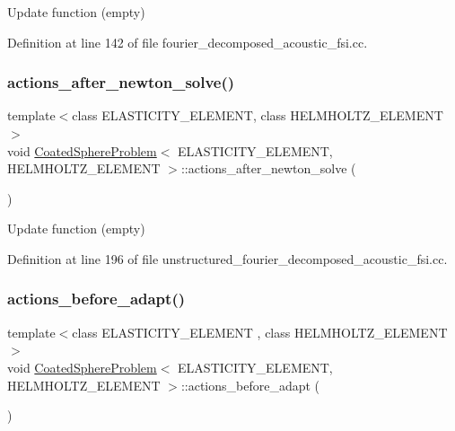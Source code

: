 Update function (empty) 



Definition at line 142 of file fourier\+\_\+decomposed\+\_\+acoustic\+\_\+fsi.\+cc.

\mbox{\label{classCoatedSphereProblem_ae5287efab54b16ec1bd5cced98971c9c}} 
\subsubsection{\texorpdfstring{actions\+\_\+after\+\_\+newton\+\_\+solve()}{actions\_after\_newton\_solve()}\hspace{0.1cm}{\footnotesize\ttfamily [2/2]}}
{\footnotesize\ttfamily template$<$class E\+L\+A\+S\+T\+I\+C\+I\+T\+Y\+\_\+\+E\+L\+E\+M\+E\+NT, class H\+E\+L\+M\+H\+O\+L\+T\+Z\+\_\+\+E\+L\+E\+M\+E\+NT$>$ \\
void \hyperlink{classCoatedSphereProblem}{Coated\+Sphere\+Problem}$<$ E\+L\+A\+S\+T\+I\+C\+I\+T\+Y\+\_\+\+E\+L\+E\+M\+E\+NT, H\+E\+L\+M\+H\+O\+L\+T\+Z\+\_\+\+E\+L\+E\+M\+E\+NT $>$\+::actions\+\_\+after\+\_\+newton\+\_\+solve (\begin{DoxyParamCaption}{ }\end{DoxyParamCaption})\hspace{0.3cm}{\ttfamily [inline]}}



Update function (empty) 



Definition at line 196 of file unstructured\+\_\+fourier\+\_\+decomposed\+\_\+acoustic\+\_\+fsi.\+cc.

\mbox{\label{classCoatedSphereProblem_a0cd5d4eea9d34eefd829f7539c41c998}} 
\subsubsection{\texorpdfstring{actions\+\_\+before\+\_\+adapt()}{actions\_before\_adapt()}}
{\footnotesize\ttfamily template$<$class E\+L\+A\+S\+T\+I\+C\+I\+T\+Y\+\_\+\+E\+L\+E\+M\+E\+NT , class H\+E\+L\+M\+H\+O\+L\+T\+Z\+\_\+\+E\+L\+E\+M\+E\+NT $>$ \\
void \hyperlink{classCoatedSphereProblem}{Coated\+Sphere\+Problem}$<$ E\+L\+A\+S\+T\+I\+C\+I\+T\+Y\+\_\+\+E\+L\+E\+M\+E\+NT, H\+E\+L\+M\+H\+O\+L\+T\+Z\+\_\+\+E\+L\+E\+M\+E\+NT $>$\+::actions\+\_\+before\+\_\+adapt (\begin{DoxyParamCaption}{ }\end{DoxyParamCaption})}



